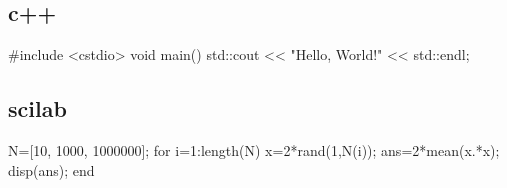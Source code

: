 \documentclass[../main]{subfiles}
\begin{document}
\subsection{c++}

\begin{pre}[language=c++]
#include <cstdio>
void main() {
    std::cout << "Hello, World!" << std::endl;
}
\end{pre}

\subsection{scilab}

\begin{pre}[language=scilab,numbers=left]
    N=[10, 1000, 1000000];
    for i=1:length(N)
        x=2*rand(1,N(i));
        ans=2*mean(x.*x);
        disp(ans);
    end
\end{pre}

\end{document}
